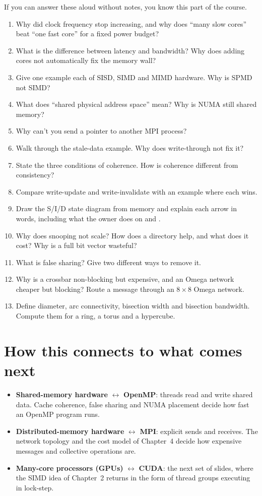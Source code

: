 If you can answer these aloud without notes, you know this part of the course.
\begin{enumerate}
  \item Why did clock frequency stop increasing, and why does ``many slow cores'' beat ``one fast core'' for a fixed power budget?
  \item What is the difference between latency and bandwidth? Why does adding cores not automatically fix the memory wall?
  \item Give one example each of SISD, SIMD and MIMD hardware. Why is SPMD not SIMD?
  \item What does ``shared physical address space'' mean? Why is NUMA still shared memory?
  \item Why can't you send a pointer to another MPI process?
  \item Walk through the stale-data example. Why does write-through not fix it?
  \item State the three conditions of coherence. How is coherence different from consistency?
  \item Compare write-update and write-invalidate with an example where each wins.
  \item Draw the S/I/D state diagram from memory and explain each arrow in words, including what the owner does on \Cread{} and \Cwrite{}.
  \item Why does snooping not scale? How does a directory help, and what does it cost? Why is a full bit vector wasteful?
  \item What is false sharing? Give two different ways to remove it.
  \item Why is a crossbar non-blocking but expensive, and an Omega network cheaper but blocking? Route a message through an $8\times8$ Omega network.
  \item Define diameter, arc connectivity, bisection width and bisection bandwidth. Compute them for a ring, a torus and a hypercube.
\end{enumerate}

\section{How this connects to what comes next}

\begin{itemize}
  \item \textbf{Shared-memory hardware} $\leftrightarrow$ \textbf{OpenMP}: threads read and write shared data. Cache coherence, false sharing and NUMA
        placement decide how fast an OpenMP program runs.
  \item \textbf{Distributed-memory hardware} $\leftrightarrow$ \textbf{MPI}: explicit sends and receives. The network topology and
        the cost model of Chapter~4 decide how expensive messages and collective operations are.
  \item \textbf{Many-core processors (GPUs)} $\leftrightarrow$ \textbf{CUDA}: the next set of slides, where the SIMD idea of Chapter~2 returns in the form of thread groups
        executing in lock-step.
\end{itemize}

